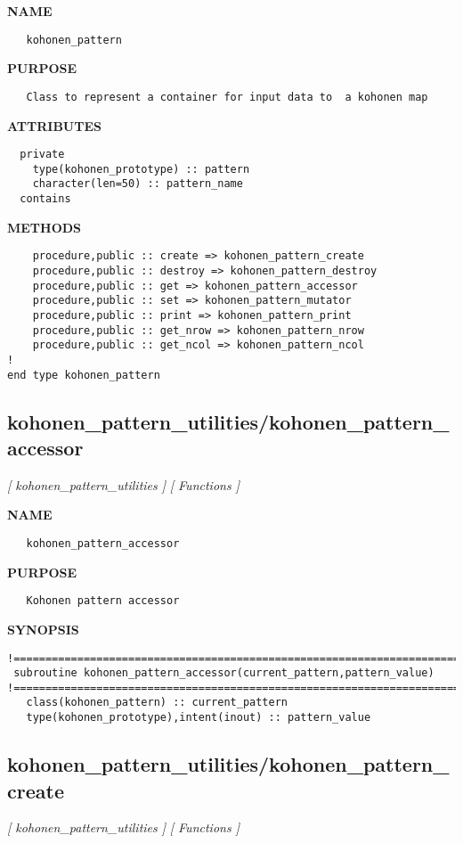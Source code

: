 \documentclass{article}
\begin{document}
\label{ch:robo23}
\label{ch:kohonen_pattern_utilities_kohonen_pattern}
\textbf{NAME}
\begin{verbatim}
   kohonen_pattern
\end{verbatim}
\textbf{PURPOSE}
\begin{verbatim}
   Class to represent a container for input data to  a kohonen map
\end{verbatim}
\textbf{ATTRIBUTES}
\begin{verbatim}
  private
    type(kohonen_prototype) :: pattern
    character(len=50) :: pattern_name 
  contains
\end{verbatim}
\textbf{METHODS}
\begin{verbatim}
    procedure,public :: create => kohonen_pattern_create
    procedure,public :: destroy => kohonen_pattern_destroy
    procedure,public :: get => kohonen_pattern_accessor
    procedure,public :: set => kohonen_pattern_mutator
    procedure,public :: print => kohonen_pattern_print
    procedure,public :: get_nrow => kohonen_pattern_nrow
    procedure,public :: get_ncol => kohonen_pattern_ncol
!
end type kohonen_pattern
\end{verbatim}
\newpage
\subsection{kohonen\_pattern\_utilities/kohonen\_pattern\_accessor}
\textsl{[ kohonen\_pattern\_utilities ]}
\textsl{[ Functions ]}

\label{ch:robo24}
\label{ch:kohonen_pattern_utilities_kohonen_pattern_accessor}
\textbf{NAME}
\begin{verbatim}
   kohonen_pattern_accessor
\end{verbatim}
\textbf{PURPOSE}
\begin{verbatim}
   Kohonen pattern accessor
\end{verbatim}
\textbf{SYNOPSIS}
\begin{verbatim}
!========================================================================================
 subroutine kohonen_pattern_accessor(current_pattern,pattern_value)
!========================================================================================
   class(kohonen_pattern) :: current_pattern
   type(kohonen_prototype),intent(inout) :: pattern_value
\end{verbatim}
\newpage
\subsection{kohonen\_pattern\_utilities/kohonen\_pattern\_create}
\textsl{[ kohonen\_pattern\_utilities ]}
\textsl{[ Functions ]}
\end{document}

